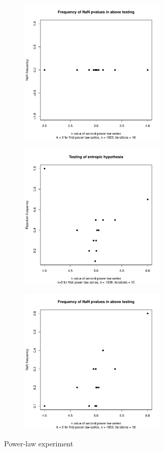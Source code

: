 \begin{figure}
\begin{subfigure}[b]{0.3\textwidth}
    \end{subfigure}
    \hfill
    \begin{subfigure}[b]{0.5\textwidth}
        \centering
        \includegraphics[height=7cm,keepaspectratio]{powerlaw/NaNPlot,k1=3, n=1000, iterations=10.pdf}
    \end{subfigure}
    \vfill
    \begin{subfigure}[b]{0.3\textwidth}
        \centering
        \includegraphics[height=7cm,keepaspectratio]{powerlaw/rejectionPlot,k1=5, n=1000, iterations=10.pdf}
    \end{subfigure}
    \hfill
    \begin{subfigure}[b]{0.5\textwidth}
        \centering
        \includegraphics[height=7cm,keepaspectratio]{powerlaw/NaNPlot,k1=5, n=1000, iterations=10.pdf}
    \end{subfigure}
    \caption{Power-law experiment}
\end{figure}

